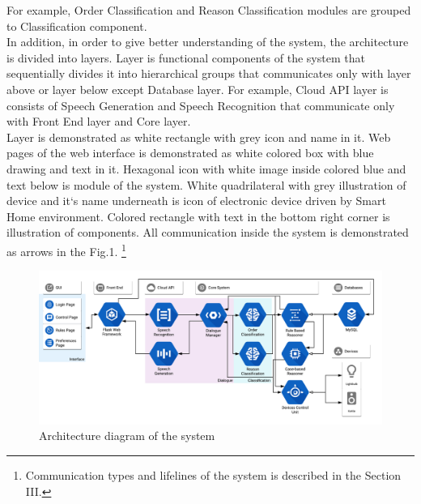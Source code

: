 \documentclass{llncs}
\begin{document}
    For example, Order Classification and Reason Classification modules are grouped to Classification component.\\
    In addition, in order to give better understanding of the system, the architecture is divided into layers.
    Layer is functional components of the system that sequentially divides it into hierarchical groups that
    communicates only with layer above or layer below except Database layer.
    For example, Cloud API layer is consists of Speech Generation and Speech Recognition that communicate only with
    Front End layer and Core layer.\\
    Layer is demonstrated as white rectangle with grey icon and name in it.
    Web pages of the web interface is demonstrated as white colored box with blue drawing and text in it.
    Hexagonal icon with white image inside colored blue and text below is module of the system.
    White quadrilateral with grey illustration of device and it`s name underneath is icon of electronic device driven
    by Smart Home environment.
    Colored rectangle with text in the bottom right corner is illustration of components.
    All communication inside the system is demonstrated as arrows in the Fig.1.
    \footnote{Communication types and lifelines of the system is described in the Section III.}
    \begin{figure}
        \includegraphics[width=\textwidth]{arch.png}
        \caption[]{Architecture diagram of the system}
    \end{figure}
\end{document}
